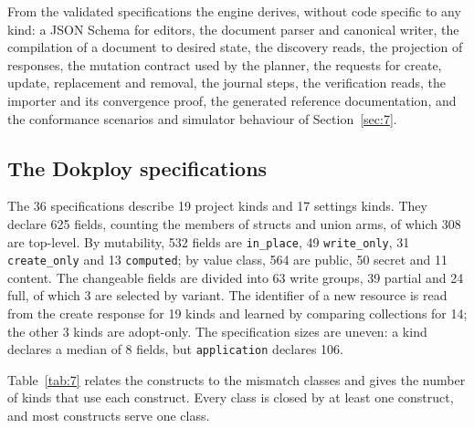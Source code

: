 From the validated specifications the engine derives, without code specific to any kind: a JSON
Schema for editors, the document parser and canonical writer, the compilation of a document to
desired state, the discovery reads, the projection of responses, the mutation contract used by the
planner, the requests for create, update, replacement and removal, the journal steps, the verification
reads, the importer and its convergence proof, the generated reference documentation, and the
conformance scenarios and simulator behaviour of Section~\ref{sec:7}.

\subsection{The Dokploy specifications}\label{sec:5.5}

The 36 specifications describe 19 project kinds and 17 settings kinds. They declare 625 fields,
counting the members of structs and union arms, of which 308 are top-level. By mutability, 532 fields
are \texttt{in\_place}, 49 \texttt{write\_only}, 31 \texttt{create\_only} and 13 \texttt{computed}; by value class, 564 are public,
50 secret and 11 content. The changeable fields are divided into 63 write groups, 39 partial and 24
full, of which 3 are selected by variant. The identifier of a new resource is read from the create
response for 19 kinds and learned by comparing collections for 14; the other 3 kinds are adopt-only.
The specification sizes are uneven: a kind declares a median of 8 fields, but \texttt{application} declares
106.

Table~\ref{tab:7} relates the constructs to the mismatch classes and gives the number of kinds that use each
construct. Every class is closed by at least one construct, and most constructs serve one class.

